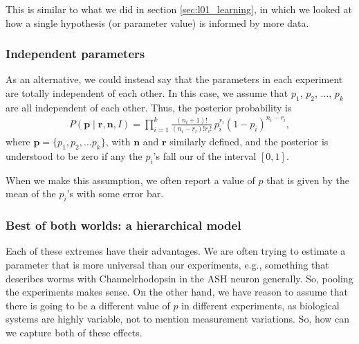 This is similar to what we did in section \ref{sec:l01_learning}, in
which we looked at how a single hypothesis (or parameter value) is
informed by more data.


\subsubsection{Independent parameters}
As an alternative, we could instead say that the parameters in each
experiment are totally independent of each other.  In this case, we
assume that $p_1$, $p_2$, $\ldots$, $p_k$ are all independent of each
other.  Thus, the posterior probability is
\begin{align}
P(\mathbf{p}\mid \mathbf{r},\mathbf{n}, I) = \prod_{i=1}^k
\frac{(n_i+1)!}{(n_i-r_i)!r_i!}\,p_i^{r_i}(1-p_i)^{n_i-r_i},
\end{align}
where $\mathbf{p} = \{p_1, p_2, \ldots p_k\}$, with $\mathbf{n}$ and
$\mathbf{r}$ similarly defined, and the posterior is understood to be
zero if any the $p_i$'s fall our of the interval $[0,1]$.  

When we make this assumption, we often report a value of $p$ that is
given by the mean of the $p_i$'s with some error bar.


\subsubsection{Best of both worlds: a hierarchical model}
Each of these extremes have their advantages.  We are often trying to
estimate a parameter that is more universal than our experiments,
e.g., something that describes worms with Channelrhodopsin in the ASH
neuron generally.  So, pooling the experiments makes sense.  On the
other hand, we have reason to assume that there is going to be a
different value of $p$ in different experiments, as biological systems
are highly variable, not to mention measurement variations.  So, how
can we capture both of these effects.

